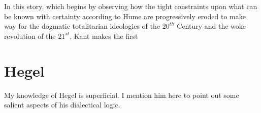 \documentclass[10pt,titlepage]{article}
\begin{document}
In this story, which begins by observing how the tight constraints upon what can be known with certainty according to Hume are progressively eroded to make way for the dogmatic totalitarian ideologies of the $20^{th}$ Century and the woke revolution of the $21^{st}$, Kant makes the first 

\section{Hegel}

My knowledge of Hegel is superficial.
I mention him here to point out some salient aspects of his dialectical logic.



{}








\end{document}
